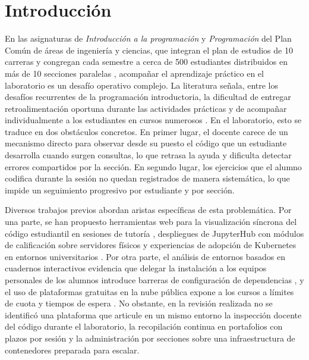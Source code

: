 \tableofcontents

\section{Introducción}
\label{sec:introduccion}

En las asignaturas de \textit{Introducción a la programación} y \textit{Programación} del Plan Común de áreas de ingeniería y ciencias, que integran el plan de estudios de 10 carreras y congregan cada semestre a cerca de 500 estudiantes distribuidos en más de 10 secciones paralelas \cite{uv2026carreras}, acompañar el aprendizaje práctico en el laboratorio es un desafío operativo complejo. La literatura señala, entre los desafíos recurrentes de la programación introductoria, la dificultad de entregar retroalimentación oportuna durante las actividades prácticas y de acompañar individualmente a los estudiantes en cursos numerosos \cite{luxton2018introductory, medeiros2019systematic}. En el laboratorio, esto se traduce en dos obstáculos concretos. En primer lugar, el docente carece de un mecanismo directo para observar desde su puesto el código que un estudiante desarrolla cuando surgen consultas, lo que retrasa la ayuda y dificulta detectar errores compartidos por la sección. En segundo lugar, los ejercicios que el alumno codifica durante la sesión no quedan registrados de manera sistemática, lo que impide un seguimiento progresivo por estudiante y por sección.

Diversos trabajos previos abordan aristas específicas de esta problemática. Por una parte, se han propuesto herramientas web para la visualización síncrona del código estudiantil en sesiones de tutoría \cite{guo2015codeopticon}, despliegues de JupyterHub con módulos de calificación sobre servidores físicos \cite{flemming2022jupyterhub} y experiencias de adopción de Kubernetes en entornos universitarios \cite{linhuber2026kubernetes}. Por otra parte, el análisis de entornos basados en cuadernos interactivos evidencia que delegar la instalación a los equipos personales de los alumnos introduce barreras de configuración de dependencias \cite{johnson2020benefits}, y el uso de plataformas gratuitas en la nube pública expone a los cursos a límites de cuota y tiempos de espera \cite{xu2023teaching}. No obstante, en la revisión realizada no se identificó una plataforma que articule en un mismo entorno la inspección docente del código durante el laboratorio, la recopilación continua en portafolios con plazos por sesión y la administración por secciones sobre una infraestructura de contenedores preparada para escalar.

